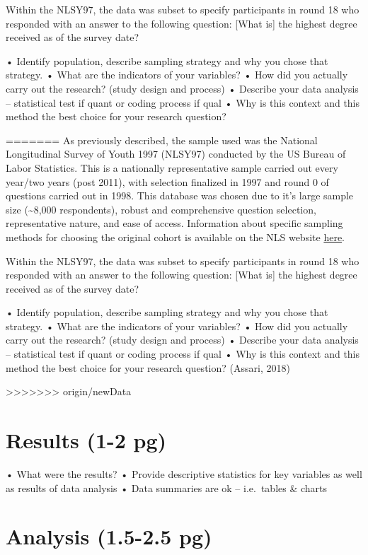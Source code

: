 \documentclass[
  man]{apa6}
\begin{document}
Within the NLSY97, the data was subset to specify participants in round 18 who responded with an answer to the following question: {[}What is{]} the highest degree received as of the survey date?

• Identify population, describe sampling strategy and why you chose that strategy. • What are the indicators of your variables? • How did you actually carry out the research? (study design and process) • Describe your data analysis -- statistical test if quant or coding process if qual • Why is this context and this method the best choice for your research question?

=======
As previously described, the sample used was the National Longitudinal Survey of Youth 1997 (NLSY97) conducted by the US Bureau of Labor Statistics. This is a nationally representative sample carried out every year/two years (post 2011), with selection finalized in 1997 and round 0 of questions carried out in 1998. This database was chosen due to it's large sample size (\textasciitilde8,000 respondents), robust and comprehensive question selection, representative nature, and ease of access. Information about specific sampling methods for choosing the original cohort is available on the NLS website \href{https://www.nlsinfo.org/content/cohorts/nlsy97}{here}.

Within the NLSY97, the data was subset to specify participants in round 18 who responded with an answer to the following question: {[}What is{]} the highest degree received as of the survey date?

• Identify population, describe sampling strategy and why you chose that strategy. • What are the indicators of your variables? • How did you actually carry out the research? (study design and process) • Describe your data analysis -- statistical test if quant or coding process if qual • Why is this context and this method the best choice for your research question? (Assari, 2018)

>>>>>>> origin/newData
\section{Results (1-2 pg)}\label{results-1-2-pg}

• What were the results? • Provide descriptive statistics for key variables as well as results of data analysis • Data summaries are ok -- i.e.~tables \& charts

\section{Analysis (1.5-2.5 pg)}\label{analysis-1.5-2.5-pg}
\end{document}

